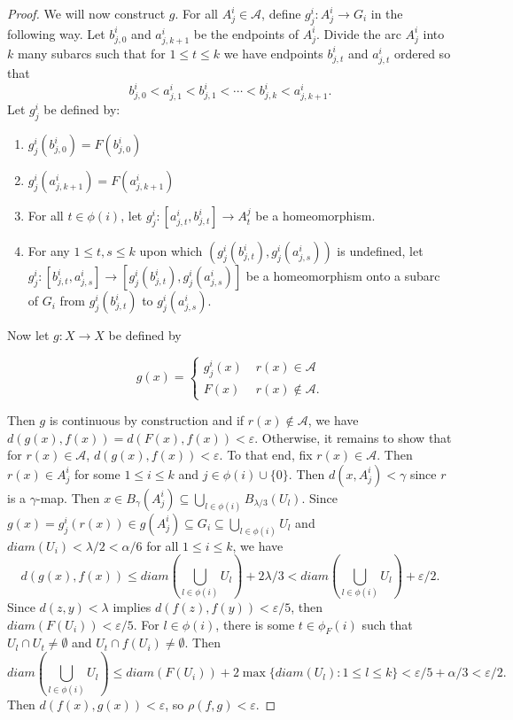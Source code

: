 \documentclass{amsart}
\numberwithin{equation}{section}
\begin{document}
\begin{proof}
We will now construct $g.$ For all $A_j^i\in \mathcal{A}$, define $g_j^i:A_j^i\to G_i$ in the following way. Let $b^i_{j,0}$ and $a^i_{j,k+1}$ be the endpoints of $A_j^i$. Divide the arc $A_j^i$ into $k$ many subarcs such that for $1\leq t\leq k$ we have endpoints $b^i_{j,t}$ and $a^i_{j,t}$ ordered so that $$ b^i_{j,0}<a^i_{j,1}<b^i_{j,1}<\cdots <b^i_{j,k}<a^i_{j,k+1}. $$ Let $g_j^i$ be defined by:
\begin{enumerate}
    \item[(1)] $g_j^i(b^i_{j,0})= F(b^i_{j,0}) $
    \item[(2)] $g_j^i(a^i_{j,k+1})= F(a^i_{j,k+1}) $
    \item[(3)] For all $t\in \phi(i)$, let $g_j^i:[a^i_{j,t},b^i_{j,t} ]\to A_t^j  $ be a homeomorphism. 
    \item[(4)] For any $1\leq t,s\leq k$ upon which $(g_j^i(b^i_{j,t}),g^i_j(a^i_{j,s}))$ is undefined, let $g_j^i:[b^i_{j,t},a^i_{j,s} ]\to [g_j^i(b^i_{j,t}),g^i_j(a^i_{j,s}) ]$ be a homeomorphism onto a subarc of $G_i$ from $g_j^i(b^i_{j,t})$ to $g^i_j(a^i_{j,s})$. 
\end{enumerate}

Now let $g:X\to X$ be defined by 

$$g(x)=\begin{cases}
    g_j^i(x)\; &r(x)\in \mathcal{A}\\
    F(x) \; &r(x)\notin \mathcal{A}.
\end{cases}$$


Then $g$ is continuous by construction and if $r(x)\notin \mathcal{A}$, we have $d(g(x),f(x))=d(F(x),f(x))<\varepsilon.$ Otherwise, it remains to show that for $r(x)\in \mathcal{A}$, $d(g(x),f(x))<\varepsilon.$ To that end, fix $r(x)\in \mathcal{A}$. Then $r(x)\in A^i_j$ for some $1\leq i\leq k$ and $j\in \phi(i)\cup \{0\}$. Then $d(x,A^i_j)<\gamma$ since $r$ is a $\gamma$-map. Then $x\in B_\gamma(A^i_j)\subseteq \bigcup_{l\in\phi(i)}B_{\lambda/3}(U_l).$ Since $g(x)=g_j^i(r(x))\in g(A^i_j)\subseteq G_i\subseteq \bigcup_{l\in\phi(i)}U_l$ and $diam(U_i)<\lambda/2<\alpha/6$ for all $1\leq i\leq k$, we have $$d(g(x),f(x))\leq diam\left( \bigcup_{l\in \phi(i)} U_l \right) +2\lambda/3<diam\left( \bigcup_{l\in \phi(i)} U_l \right)+\varepsilon/2.$$ Since $d(z,y)<\lambda$ implies $d(f(z),f(y))<\varepsilon/5$, then $diam(F(U_i))<\varepsilon/5. $ For $l\in \phi(i)$, there is some $t\in \phi_F(i)$ such that $U_l\cap U_t \neq \emptyset$ and $U_t\cap f(U_i) \neq \emptyset$. Then $$diam\left( \bigcup_{l\in \phi(i)} U_l \right) \leq diam(F(U_i))+2\max \{ diam(U_l):1\leq l\leq k\}<\varepsilon/5 +\alpha/3<\varepsilon/2.$$ Then $d(f(x),g(x))<\varepsilon$, so $\rho(f,g)<\varepsilon.$



\end{proof}
\end{document}
